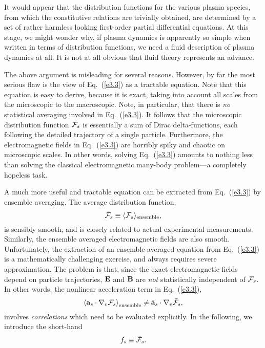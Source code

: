 It would appear that the distribution functions for the various plasma
species, from which
the constitutive relations are trivially obtained, are determined by a set of
rather harmless looking first-order partial differential equations. At this
stage, we might wonder why, 
if plasma dynamics is apparently so  simple when written in terms
of distribution functions, we need a fluid description of plasma dynamics
at all. It is not at all obvious that fluid theory represents an advance. 

The above argument is misleading for several reasons. However, by far the
most serious flaw is the view of Eq.~(\ref{e3.3}) as a tractable equation.
Note that this equation is easy to derive, because it is exact, taking into
account all scales from the microscopic to the macroscopic. Note, in
particular, that there is {\em no}\/ statistical averaging involved in Eq.~(\ref{e3.3}). 
It follows that the microscopic distribution function ${\cal F}_s$ is
essentially a sum of Dirac delta-functions, each following the
detailed trajectory of a single particle. Furthermore, the electromagnetic
fields in Eq.~(\ref{e3.3}) are horribly spiky and chaotic on microscopic scales. In other words, solving Eq.~(\ref{e3.3}) amounts to nothing less than solving the classical
electromagnetic many-body problem---a completely hopeless task. 

A much more useful and tractable equation can be extracted from Eq.~(\ref{e3.3})
by ensemble averaging. The average distribution function,
\begin{equation}
\bar{\cal F}_s \equiv \langle {\cal F}_s\rangle_{\rm ensemble},
\end{equation}
is sensibly smooth, and is closely related to actual experimental measurements.
Similarly, the ensemble averaged electromagnetic fields are also smooth.
Unfortunately, the extraction of an ensemble averaged
equation from Eq.~(\ref{e3.3}) is a mathematically challenging exercise, and always
requires severe approximation. The problem is that, since the
exact electromagnetic fields depend on particle trajectories, ${\bf E}$ and
${\bf B}$ are {\em not}\/ statistically independent of ${\cal F}_s$. In other
words, the nonlinear acceleration term in Eq.~(\ref{e3.3}),
\begin{equation}
\left\langle{\bf a}_s\cdot\nabla_v {\cal F}_s\right\rangle_{\rm ensemble}
\neq \bar{\bf a}_s\cdot\nabla_v \bar{{\cal F}}_s,
\end{equation}
involves {\em correlations}\/ which need to be evaluated explicitly.
In the following, we introduce the short-hand
\begin{equation}
f_s\equiv \bar{{\cal F}}_s.
\end{equation}

